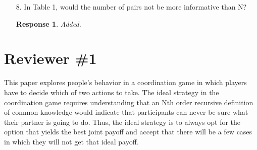 \documentclass[a4paper]{article}
\newtheorem{response}{Response}
\newenvironment{tobo}{\smallskip \noindent \color{yellow!80!black!80}}{\color{black}\smallskip}
\begin{document}
\begin{enumerate}
  \item[8.]    In Table 1, would the number of pairs not be more informative than N? \begin{response}Added. \end{response}
\end{enumerate}  

\section*{Reviewer \#1}
This paper explores people's behavior in a coordination game in which players have to decide which of two actions to take. The ideal strategy in the coordination game requires understanding that an Nth order recursive definition of common knowledge would indicate that participants can never be sure what their partner is going to do. Thus, the ideal strategy is to always opt for the option that yields the best joint payoff and accept that there will be a few cases in which they will not get that ideal payoff. 
\end{document}
